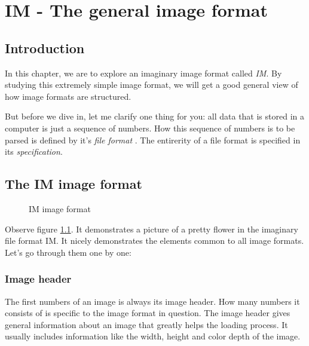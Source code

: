 \chapter{IM - The general image format}
\label{cha:im}

\begin{refsection}

  \section{Introduction}
  \label{sec:introduction}

  In this chapter, we are to explore an imaginary image format called
  \textit{IM}. By studying this extremely simple image format, we will get a good
  general view of how image formats are structured.

  But before we dive in, let me clarify one thing for you: all data that
  is stored in a computer is just a sequence of numbers. How this
  sequence of numbers is to be parsed is defined by it's \textit{file
    format} . The entirerity of a file format is
  specified in its \textit{specification}.

  \section{The IM image format}
  \label{sec:general-image-format}

  \begin{figure}
    \centering
    \caption{IM image format}
    \label{fig:im}
  \end{figure}

  Observe figure \ref{fig:im}. It demonstrates a picture of a pretty
  flower in the imaginary file format IM. It nicely
  demonstrates the elements common to all image formats. Let's go
  through them one by one:

  \subsection{Image header}
  \label{sec:image-header}

  The first numbers of an image is always its image header. How many numbers it consists of is specific to the image
  format in question. The image header gives general information about
  an image that greatly helps the loading process. It usually includes
  information like the width, height and color depth of the image.


\end{refsection}
